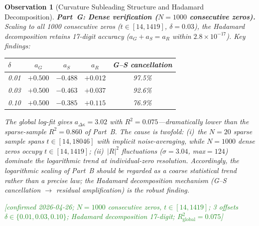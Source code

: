 \documentclass[11pt, a4paper]{article}
\theoremstyle{definition}
\theoremstyle{plain}
\newtheorem{observation}[theorem]{Observation}
\begin{document}
\begin{observation}[Curvature Subleading Structure and Hadamard Decomposition]
\smallskip\noindent
\textbf{Part~G: Dense verification ($N{=}1000$ consecutive zeros).}\;
Scaling to all 1000 consecutive zeros ($t \in [14, 1419]$,
$\delta = 0.03$), the Hadamard decomposition retains
17-digit accuracy ($a_G + a_S = a_R$ within $2.8 \times 10^{-17}$).
Key findings:
\begin{center}
\small
\begin{tabular}{@{} l c c c c @{}}
\toprule
$\delta$ & $a_G$ & $a_S$ & $a_R$ & G--S cancellation \\
\midrule
0.01 & $+0.500$ & $-0.488$ & $+0.012$ & 97.5\% \\
0.03 & $+0.500$ & $-0.463$ & $+0.037$ & 92.6\% \\
0.10 & $+0.500$ & $-0.385$ & $+0.115$ & 76.9\% \\
\bottomrule
\end{tabular}
\end{center}
The global log-fit gives $a_{\Delta\kappa} = 3.02$ with
$R^2 = 0.075$---dramatically lower than the sparse-sample
$R^2 = 0.860$ of Part~B\@.  The cause is twofold:
(i)~the $N{=}20$ sparse sample spans $t \in [14, 18046]$
with implicit noise-averaging, while $N{=}1000$ dense zeros occupy
$t \in [14, 1419]$;
(ii)~$|R|^2$ fluctuations ($\sigma = 3.04$, max${=}124$) dominate
the logarithmic trend at individual-zero resolution.
Accordingly, the logarithmic scaling of Part~B should be regarded
as a coarse statistical trend rather than a precise law;
the Hadamard decomposition \emph{mechanism}
(G--S cancellation $\to$ residual amplification) is the robust finding.

\textcolor{ForestGreen}{[confirmed 2026-04-26; $N{=}1000$ consecutive zeros,
$t \in [14, 1419]$; 3 offsets $\delta \in \{0.01, 0.03, 0.10\}$;
Hadamard decomposition 17-digit; $R^2_\text{global}{=}0.075$]}
\end{observation}
\end{document}
